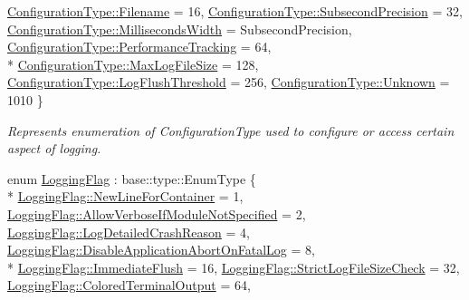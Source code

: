 \begin{DoxyCompactItemize}
\hyperlink{namespaceel_a281f5db6d6163678bc68a8b23b59e124a1351017ac6423911223bc19a8cb7c653}{Configuration\-Type\-::\-Filename} = 16, 
\hyperlink{namespaceel_a281f5db6d6163678bc68a8b23b59e124a945b6ef21f66457079a6ab7b6c3459f9}{Configuration\-Type\-::\-Subsecond\-Precision} = 32, 
\hyperlink{namespaceel_a281f5db6d6163678bc68a8b23b59e124a052bf0f0c813b3c41c5b5046ebc26529}{Configuration\-Type\-::\-Milliseconds\-Width} = Subsecond\-Precision, 
\hyperlink{namespaceel_a281f5db6d6163678bc68a8b23b59e124abe9e43d200c5698cb8519daed7035874}{Configuration\-Type\-::\-Performance\-Tracking} = 64, 
\\*
\hyperlink{namespaceel_a281f5db6d6163678bc68a8b23b59e124a4b35e615142d60db6383426f051e700b}{Configuration\-Type\-::\-Max\-Log\-File\-Size} = 128, 
\hyperlink{namespaceel_a281f5db6d6163678bc68a8b23b59e124ac1b4aae5c168e64292c9aa87a124ae86}{Configuration\-Type\-::\-Log\-Flush\-Threshold} = 256, 
\hyperlink{namespaceel_a281f5db6d6163678bc68a8b23b59e124a88183b946cc5f0e8c96b2e66e1c74a7e}{Configuration\-Type\-::\-Unknown} = 1010
 \}
\begin{DoxyCompactList}\small\item\em Represents enumeration of Configuration\-Type used to configure or access certain aspect of logging. \end{DoxyCompactList}\item 
enum \hyperlink{namespaceel_a2784aacd04cb7816ac1c0b20fcbf83cb}{Logging\-Flag} \-: base\-::type\-::\-Enum\-Type \{ \\*
\hyperlink{namespaceel_a2784aacd04cb7816ac1c0b20fcbf83cba8246f93d9afd63f87632d2d718cabca8}{Logging\-Flag\-::\-New\-Line\-For\-Container} = 1, 
\hyperlink{namespaceel_a2784aacd04cb7816ac1c0b20fcbf83cbac80d746c4296fe8e99ed032f5ffef31e}{Logging\-Flag\-::\-Allow\-Verbose\-If\-Module\-Not\-Specified} = 2, 
\hyperlink{namespaceel_a2784aacd04cb7816ac1c0b20fcbf83cba81ac37ef3ee37a01bf853be6abeb4ede}{Logging\-Flag\-::\-Log\-Detailed\-Crash\-Reason} = 4, 
\hyperlink{namespaceel_a2784aacd04cb7816ac1c0b20fcbf83cba8dd9782f8a19cf7a41e4ec38d1c6a4ae}{Logging\-Flag\-::\-Disable\-Application\-Abort\-On\-Fatal\-Log} = 8, 
\\*
\hyperlink{namespaceel_a2784aacd04cb7816ac1c0b20fcbf83cba7817e369fa619155822043e76ef88c7c}{Logging\-Flag\-::\-Immediate\-Flush} = 16, 
\hyperlink{namespaceel_a2784aacd04cb7816ac1c0b20fcbf83cba8496303f20ab09751ff3ec8802b187f5}{Logging\-Flag\-::\-Strict\-Log\-File\-Size\-Check} = 32, 
\hyperlink{namespaceel_a2784aacd04cb7816ac1c0b20fcbf83cbaeececaef2fc38e4f3c91f9f6b6fb6d49}{Logging\-Flag\-::\-Colored\-Terminal\-Output} = 64, 

\end{DoxyCompactItemize}
